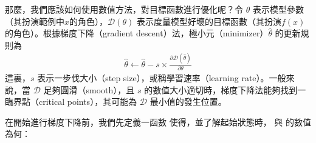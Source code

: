 \documentclass[letterpaper,10pt,english]{sphinxmanual}
\begin{document}
那麼，我們應該如何使用數值方法，對目標函數進行優化呢？令 \(\theta\) 表示模型參數（其扮演範例中\(x\)的角色），\(\mathcal{D}(\theta)\) 表示度量模型好壞的目標函數（其扮演\(f(x)\)的角色）。根據梯度下降（gradient descent）法，極小元（minimizer）\(\widehat{\theta}\) 的更新規則為
\begin{equation*}
\begin{split}
\widehat{\theta} \leftarrow \widehat{\theta} - s \times \frac{\partial \mathcal{D}(\widehat{\theta})}{\partial \theta}
\end{split}
\end{equation*}
這裏，\(s\) 表示一步伐大小（step size），或稱學習速率（learning rate）。一般來說，當 \(\mathcal{D}\) 足夠圓滑（smooth），且 \(s\) 的數值大小適切時，梯度下降法能夠找到一臨界點（critical points），其可能為 \(\mathcal{D}\) 最小值的發生位置。

在開始進行梯度下降前，我們先定義一函數  使得，並了解起始狀態時， 與  的數值為何：

\begin{sphinxVerbatim}[commandchars=\\\{\}]
 
            
     
\end{sphinxVerbatim}

\begin{sphinxVerbatim}[commandchars=\\\{\}]
  \PYG{p}{[}  \PYG{p}{]}
                   
  
 
\end{sphinxVerbatim}
\end{document}
